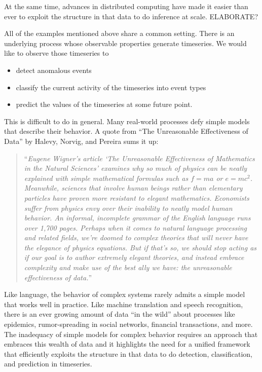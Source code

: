
At the same time, advances in distributed computing have made it easier than ever to exploit the structure in that data to do inference at scale. ELABORATE?

All of the examples mentioned above share a common setting. There is an underlying process whose observable properties generate timeseries. We would like to observe those timeseries to 
\begin{itemize}
\item detect anomalous events
\item classify the current activity of the timeseries into event types
\item predict the values of the timeseries at some future point.
\end{itemize}

This is difficult to do in general. Many real-world processes defy simple models that describe their behavior. A quote from ``The Unreasonable Effectiveness of Data'' by Halevy, Norvig, and Pereira sums it up:
\begin{quote}
``{\em Eugene Wigner's article `The Unreasonable Effectiveness of Mathematics in the Natural Sciences' examines why so much of physics can be neatly explained with simple mathematical formulas such as $f = ma$ or $e = mc^2$. Meanwhile, sciences that involve human beings rather than elementary particles have proven more resistant to elegant mathematics. Economists suffer from physics envy over their inability to neatly model human behavior. An informal, incomplete grammar of the English language runs over 1,700 pages. Perhaps when it comes to natural language processing and related fields, we're doomed to complex theories that will never have the elegance of physics equations. But if that's so, we should stop acting as if our goal is to author extremely elegant theories, and instead embrace complexity and make use of the best ally we have: the unreasonable effectiveness of data.}''
\end{quote}

Like language, the behavior of complex systems rarely admits a simple model that works well in practice. Like machine translation and speech recognition, there is an ever growing amount of data ``in the wild'' about processes like epidemics, rumor-spreading in social networks, financial transactions, and more. The inadequacy of simple models for complex behavior requires an approach that embraces this wealth of data and it highlights the need for a unified framework that efficiently exploits the structure in that data to do detection, classification, and prediction in timeseries.

